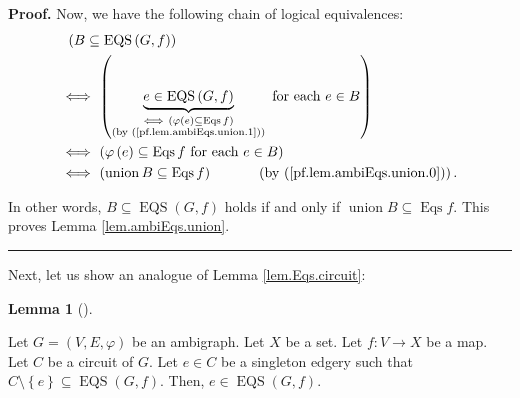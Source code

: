 \documentclass[numbers=enddot,12pt,final,onecolumn,notitlepage]{scrartcl}%
\theoremstyle{definition}
\newtheorem{lem}[theo]{Lemma}
\newenvironment{lemma}[1][]
{\begin{lem}[#1]\begin{leftbar}}
{\end{leftbar}\end{lem}}
\newenvironment{proof}[1][Proof]{\noindent\textbf{#1.} }{\ \rule{0.5em}{0.5em}}
\newenvironment{verlong}{}{}
\begin{document}
\begin{proof}
\begin{verlong}
Now, we have the following chain of logical equivalences:%
\begin{align*}
&  \ \left(  B\subseteq\operatorname*{EQS}\left(  G,f\right)  \right) \\
&  \Longleftrightarrow\ \left(  \underbrace{e\in\operatorname*{EQS}\left(
G,f\right)  }_{\substack{\Longleftrightarrow\ \left(  \varphi\left(  e\right)
\subseteq\operatorname*{Eqs}f\right)  \\\text{(by
(\ref{pf.lem.ambiEqs.union.1}))}}}\text{ for each }e\in B\right) \\
&  \Longleftrightarrow\ \left(  \varphi\left(  e\right)  \subseteq
\operatorname*{Eqs}f\text{ for each }e\in B\right) \\
&  \Longleftrightarrow\ \left(  \operatorname*{union}B\subseteq
\operatorname*{Eqs}f\right)  \ \ \ \ \ \ \ \ \ \ \left(  \text{by
(\ref{pf.lem.ambiEqs.union.0})}\right)  .
\end{align*}

\end{verlong}

In other words, $B\subseteq\operatorname*{EQS}\left(  G,f\right)  $ holds if
and only if $\operatorname*{union}B\subseteq\operatorname*{Eqs}f$. This proves
Lemma \ref{lem.ambiEqs.union}.
\end{proof}

Next, let us show an analogue of Lemma \ref{lem.Eqs.circuit}:

\begin{lemma}
\label{lem.ambiEqs.circuit}Let $G=\left(  V,E,\varphi\right)  $ be an
ambigraph. Let $X$ be a set. Let $f:V\rightarrow X$ be a map. Let $C$ be a
circuit of $G$. Let $e\in C$ be a singleton edgery such that $C\setminus
\left\{  e\right\}  \subseteq\operatorname*{EQS}\left(  G,f\right)  $. Then,
$e\in\operatorname*{EQS}\left(  G,f\right)  $.
\end{lemma}
\end{document}
